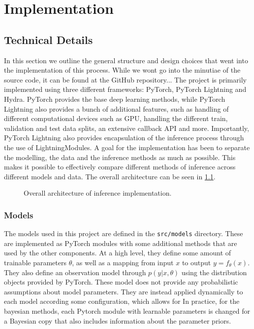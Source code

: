 \chapter{Implementation}

\section{Technical Details}

In this section we outline the general structure and design choices that went into the implementation of this process. 
While we wont go into the minutiae of the source code, it can be found at the GitHub repository...
The project is primarily implemented using three different frameworks: PyTorch, PyTorch Lightning and Hydra.
PyTorch provides the base deep learning methods, while PyTorch Lightning also provides a bunch of additional features, such as handling of different computational devices such as GPU, handling the different train, validation and test data splits, an extensive callback API and more.
Importantly, PyTorch Lightning also provides encapsulation of the inference process through the use of LightningModules.
A goal for the implementation has been to separate the modelling, the data and the inference methods as much as possible.
This makes it possible to effectively compare different methods of inference across different models and data.
The overall architecture can be seen in \cref{fig:sw-arch}.
\begin{figure}[htbp]
    \centering
    
    \caption{Overall architecture of inference implementation. }
    \label{fig:sw-arch}
\end{figure}

\subsection{Models}
The models used in this project are defined in the \texttt{src/models} directory.
These are implemented as PyTorch modules with some additional methods that are used by the other components. 
At a high level, they define some amount of trainable parameters $\theta$, as well as a mapping from input $x$ to output $y=f_\theta(x)$. 
They also define an observation model through $p(y|x, \theta)$ using the distribution objects provided by PyTorch.
These model does not provide any probabilistic assumptions about model parameters.
They are instead applied dynamically to each model according some configuration, which allows for 
In practice, for the bayesian methods, each Pytorch module with learnable parameters is changed for a Bayesian copy that also includes information about the parameter priors.

